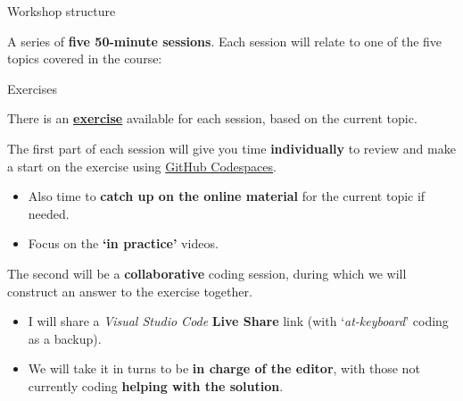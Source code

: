 \documentclass[10pt, dvipsnames, table, aspectratio=169]{beamer}
\begin{document}

\begin{frame}[fragile]{Workshop structure}

A series of \textbf{five 50-minute sessions}.
Each session will relate to one of the five topics covered in the course:

\begin{centering}

\begin{table}[h!]

    \centering

    

\end{table}

\end{centering}

\end{frame}


\begin{frame}[fragile]{Exercises}

There is an \href{https://github.com/martinteaching/sustainability/blob/master/workshops/kcl/2025/workshop-exercises.md}{\textbf{exercise}} available for each session, based on the current topic.

\pause

The first part of each session will give you time \textbf{individually} to review and make a start on the exercise using \href{https://github.com/martinteaching/sustainability/tree/master/workshops/kcl/2025#github-codespaces-recommended}{GitHub Codespaces}.

\begin{itemize}

    \item Also time to \textbf{catch up on the online material} for the current topic if needed.
    
    \item Focus on the \textbf{`in practice'} videos.

\end{itemize}

\pause 

The second will be a \textbf{collaborative} coding session, during which we will construct an answer to the exercise together.

\begin{itemize}

  \item I will share a \emph{Visual Studio Code} \textbf{Live Share} link (with `\textit{at-keyboard}' coding as a backup).

  \item We will take it in turns to be \textbf{in charge of the editor}, with those not currently coding \textbf{helping with the solution}.

\end{itemize}

\end{frame}
\end{document}
